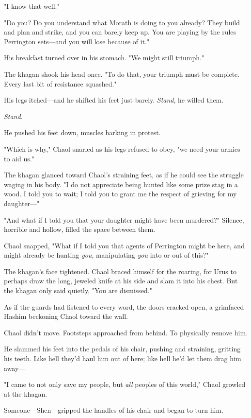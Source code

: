"I know that well."

"Do you?
Do you understand what Morath is doing to you already?
They build and plan and strike, and you can barely keep up.
You are playing by the rules Perrington sets---and you will lose because of it."

His breakfast turned over in his stomach.
"We might still triumph."

The khagan shook his head once.
"To do that, your triumph must be complete.
Every last bit of resistance squashed."

His legs itched---and he shifted his feet just barely.
\emph{Stand}, he willed them.

\emph{Stand}.

He pushed his feet down, muscles barking in protest.

"Which is why," Chaol snarled as his legs refused to obey, "we need your armies to aid us."

The khagan glanced toward Chaol's straining feet, as if he could see the struggle waging in his body.
"I do not appreciate being hunted like some prize stag in a wood.
I told you to wait; I told you to grant me the respect of grieving for my daughter---"

"And what if I told you that your daughter might have been murdered?"
Silence, horrible and hollow, filled the space between them.

Chaol snapped, "What if I told you that agents of Perrington might be here, and might already be hunting \emph{you}, manipulating \emph{you}
into or out of this?"

The khagan's face tightened.
Chaol braced himself for the roaring, for Urus to perhaps draw the long, jeweled knife at his side and slam it into his chest.
But the khagan only said quietly, "You are dismissed."

As if the guards had listened to every word, the doors cracked open, a grimfaced Hashim beckoning Chaol toward the wall.

Chaol didn't move.
Footsteps approached from behind.
To physically remove him.

He slammed his feet into the pedals of his chair, pushing and straining, gritting his teeth.
Like hell they'd haul him out of here; like hell he'd let them drag him away---

"I came to not only save my people, but \emph{all} peoples of this world," Chaol growled at the khagan.

Someone---Shen---gripped the handles of his chair and began to turn him.

